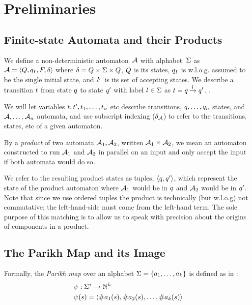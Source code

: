 \documentclass[acmsmall,review,anonymous,screen]{acmart}\settopmatter{printfolios=true,printccs=false,printacmref=true}
\theoremstyle{definition}
\newif\ifoutline
\newcommand{\contents}[1]{\ifoutline{\color{blue}
    \begin{itemize}
    #1
    \end{itemize}
  }\fi}
\begin{document}
\section{Preliminaries}

\contents{\item Monoid
\item Alfabet
\item ord oever alfabet
\item konkatenering
}

\subsection{Finite-state Automata and their Products}
We define a non-deterministic automaton~$\mathcal{A}$ with alphabet~$\Sigma$
as $\mathcal{A} = \left\langle Q, q_I, F, \delta\right\rangle$ where $\delta = Q \times \Sigma
\times Q$, $Q$ is its states, $q_I$ is w.l.o.g. assumed to
be the single initial state, and $F$ is its set of accepting
states.  We describe a transition $t$ from state $q$ to state
$q'$ with label $l \in \Sigma$ as $t =
q \xrightarrow{l} q'$. .

We will let variables $t, t', t_1, \ldots,
t_n$ etc describe transitions, $q, \ldots, q_n$ states, and
$\mathcal{A}, \ldots, \mathcal{A}_n$ automata, and use subscript indexing
($\delta_{\mathcal{A}}$) to refer to the transitions, states, etc of a given
automaton.

By a \emph{product} of two automata $\mathcal{A}_1, \mathcal{A}_2$, written
$\mathcal{A}_1 \times \mathcal{A}_2$, we mean an automaton constructed to run
$\mathcal{A}_1$ and $\mathcal{A}_2$ in parallel on an input and only accept the
input if both automata would do so.

We refer to the resulting product states as tuples, $\left\langle q, q'\right\rangle$,
which represent the state of the product automaton where $\mathcal{A}_1$ would be
in $q$ and $\mathcal{A}_2$ would be in $q'$. Note that since we use
ordered tuples the product is technically (but w.l.o.g) not commutative; the
left-hand-side must come from the left-hand term. The sole purpose of this
matching is to allow us to speak with precision about the origins of components
in a product.

\subsection{The Parikh Map and its Image}
Formally, the \textit{Parikh map} over an alphabet $\Sigma=
\left\{a_1, \ldots, a_k \right\}$ is defined as in \cite{kozen}:
$$
\begin{aligned}
& \operatorname{\psi}: \Sigma^* \rightarrow \mathbb{N}^k \\
& \operatorname{\psi}(s) = \left\langle\#a_1(s), \#a_2(s), \ldots, \#a_k(s)\right\rangle
\end{aligned}
$$
\end{document}
